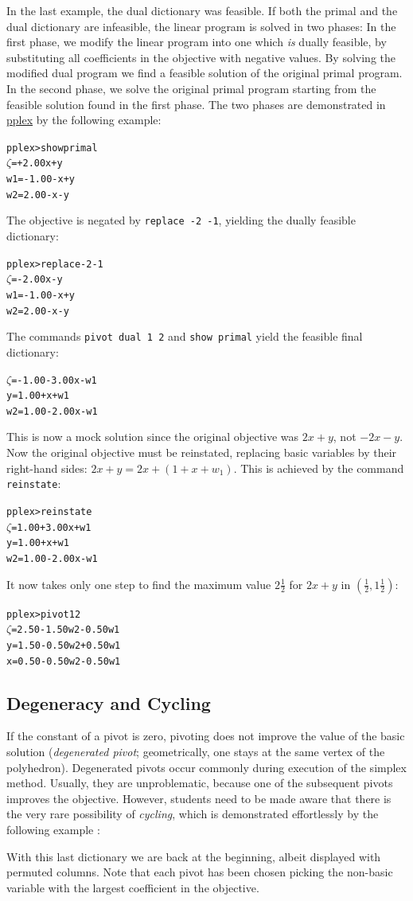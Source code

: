\documentclass[ukenglish]{nik}
\begin{document}
In the last example, the dual dictionary was feasible. If both the primal and
the dual dictionary are infeasible, the linear program is solved in two phases: In the first phase,
we modify the linear program into one which \emph{is} dually feasible, by substituting all coefficients in the objective with negative values.
By solving the modified dual program we find a feasible solution of the original primal
program. In the second phase, we solve the original primal program starting from the 
feasible solution found in the first phase.
The two phases are demonstrated in \url{pplex} by the following example:
\begin{alltt}
pplex> show primal
 \(\zeta\) =        + 2.00x + y
w1 = - 1.00 -     x + y
w2 =   2.00 -     x - y
\end{alltt}
The objective is negated by \verb|replace -2 -1|,
yielding the dually feasible dictionary:
\begin{alltt}
pplex> replace -2 -1
 \(\zeta\)  =        - 2.00x - y
w1 = - 1.00 -     x + y
w2 =   2.00 -     x - y
\end{alltt}
The commands \verb|pivot dual 1 2| and \verb|show primal|
yield the feasible final dictionary:
\begin{alltt}
 \(\zeta\) = - 1.00 - 3.00x - w1
 y =   1.00 +     x + w1
w2 =   1.00 - 2.00x - w1
\end{alltt}
This is now a mock solution since the original objective was $2x+y$,
not $-2x-y$. Now the original objective must be reinstated,
replacing basic variables by their right-hand sides: $2x+y = 2x+(1+x+w_1)$.
This is achieved by the command \verb|reinstate|:
\begin{alltt}
pplex> reinstate
 \(\zeta\) = 1.00 + 3.00x + w1
 y = 1.00 +     x + w1
w2 = 1.00 - 2.00x - w1
\end{alltt}
It now takes only one step to find the maximum value $2\frac{1}{2}$ 
for $2x+y$ in $(\frac{1}{2},1\frac{1}{2})$:

\begin{alltt}
pplex> pivot 1 2
 \(\zeta\) = 2.50 - 1.50w2 - 0.50w1
 y = 1.50 - 0.50w2 + 0.50w1
 x = 0.50 - 0.50w2 - 0.50w1
\end{alltt}


\subsection{Degeneracy and Cycling}\label{sec:cycling}
If the constant of a pivot is zero, pivoting does not improve the value of the basic solution (\emph{degenerated pivot}; geometrically, one stays at the same vertex of the polyhedron). Degenerated pivots occur commonly during execution of the simplex method. Usually, they are unproblematic, because one of the subsequent pivots improves
the objective. However, students need to be made aware that there is the very rare possibility of \emph{cycling},
which is demonstrated effortlessly by the following example \cite{Chvatal,Vanderbei}:
\begin{alltt}

\end{alltt}
With this last dictionary we are back at the beginning, 
albeit displayed with permuted columns. Note that each pivot has been
chosen picking the non-basic variable with the largest coefficient in the objective.
\end{document}
